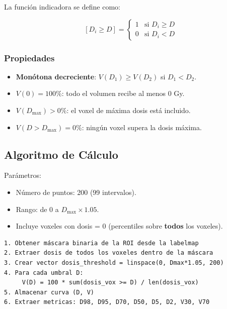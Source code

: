 \documentclass[12pt,a4paper]{article}
\begin{document}

La función indicadora se define como:

$$[D_i \geq D] = \begin{cases} 1 & \text{si } D_i \geq D \\ 0 & \text{si } D_i < D \end{cases}$$

\subsubsection{Propiedades}

\begin{itemize}
  \item \textbf{Monótona decreciente}: $V(D_1) \geq V(D_2)$ si $D_1 < D_2$.
  \item \textbf{$V(0) = 100\%$}: todo el volumen recibe al menos 0 Gy.
  \item \textbf{$V(D_{\max}) > 0\%$}: el voxel de máxima dosis está incluido.
  \item \textbf{$V(D > D_{\max}) = 0\%$}: ningún voxel supera la dosis máxima.
\end{itemize}

\subsection{Algoritmo de Cálculo}

Parámetros:
\begin{itemize}
  \item Número de puntos: 200 (99 intervalos).
  \item Rango: de 0 a $D_{\max} \times 1.05$.
  \item Incluye voxeles con dosis = 0 (percentiles sobre \textbf{todos} los voxeles).
\end{itemize}

\begin{lstlisting}
1. Obtener máscara binaria de la ROI desde la labelmap
2. Extraer dosis de todos los voxeles dentro de la máscara
3. Crear vector dosis_threshold = linspace(0, Dmax*1.05, 200)
4. Para cada umbral D:
     V(D) = 100 * sum(dosis_vox >= D) / len(dosis_vox)
5. Almacenar curva (D, V)
6. Extraer metricas: D98, D95, D70, D50, D5, D2, V30, V70
\end{lstlisting}
\end{document}
